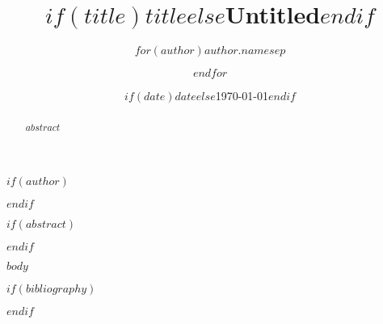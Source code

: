 \documentclass[10pt]{article}
\begin{document}
\begin{CJK}{UTF8}{gbsn}

\title{$if(title)$$title$$else$Untitled$endif$}
$if(author)$
  \author{
    $for(author)$$author.name$$sep$ \and $endfor$
  }
$endif$
\date{$if(date)$$date$$else$\today$endif$}

\maketitle

$if(abstract)$
  \begin{abstract}
  $abstract$
  \end{abstract}
$endif$

$body$

$if(bibliography)$
  
  
$endif$

\end{CJK}
\end{document}
